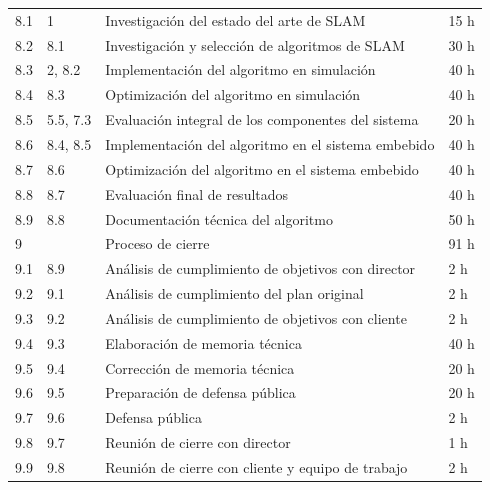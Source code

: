 \documentclass[
11pt, %
codirector, %
]{charter}
\begin{document}
\begin{table}[htpb]
\begin{tabular}{@{}llll@{}}
8.1             & 1                    & Investigación del estado del arte de SLAM          & 15 h               \\
8.2             & 8.1                  & Investigación y selección de algoritmos de SLAM    & 30 h               \\
8.3             & 2, 8.2               & Implementación del algoritmo en simulación         & 40 h               \\
8.4             & 8.3                  & Optimización del algoritmo en simulación           & 40 h               \\
8.5             & 5.5, 7.3             & Evaluación integral de los componentes del sistema & 20 h               \\
8.6             & 8.4, 8.5             & Implementación del algoritmo en el sistema embebido  & 40 h               \\
8.7             & 8.6                  & Optimización del algoritmo en el sistema embebido  & 40 h               \\
8.8             & 8.7                  & Evaluación final de resultados                     & 40 h               \\
8.9             & 8.8                  & Documentación técnica del algoritmo                & 50 h               \\
9               &                      & Proceso de cierre                                  & 91 h               \\
9.1             & 8.9                  & Análisis de cumplimiento de objetivos con director & 2 h                \\
9.2             & 9.1                  & Análisis de cumplimiento del plan original         & 2 h                \\
9.3             & 9.2                  & Análisis de cumplimiento de objetivos con cliente  & 2 h                \\
9.4             & 9.3                  & Elaboración de memoria técnica                     & 40 h               \\
9.5             & 9.4                  & Corrección de memoria técnica                      & 20 h               \\
9.6             & 9.5                  & Preparación de defensa pública                     & 20 h               \\
9.7             & 9.6                  & Defensa pública                                    & 2 h                \\
9.8             & 9.7                  & Reunión de cierre con director                     & 1 h                \\
9.9             & 9.8                  & Reunión de cierre con cliente y equipo de trabajo  & 2 h                \\ \bottomrule
\end{tabular}
\end{table}
\end{document}
